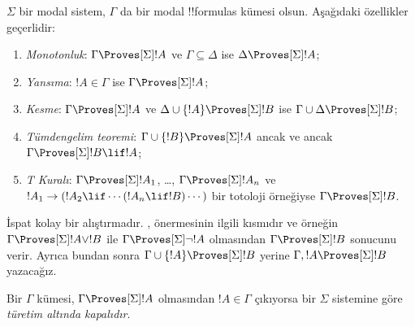 



\begin{prop}
  $\Sigma$ bir modal sistem, $\Gamma$ da bir modal !!{formula}s kümesi olsun.
  Aşağıdaki özellikler geçerlidir:
  \begin{enumerate}
  \item{} \emph{Monotonluk}:
    $\Gamma\Proves[\Sigma]!A$ ve $\Gamma\subseteq\Delta$ ise
    $\Delta\Proves[\Sigma]!A$;
  \item{}
    \emph{Yansıma}: $!A\in\Gamma$ ise
    $\Gamma\Proves[\Sigma]!A$;
  \item{} \emph{Kesme}:
    $\Gamma\Proves[\Sigma]!A$ ve
    $\Delta\cup\{!A\}\Proves[\Sigma]!B$ ise
    $\Gamma\cup\Delta\Proves[\Sigma]!B$;
  \item{} \emph{Tümdengelim teoremi}:
    $\Gamma\cup\{!B\}\Proves[\Sigma]!A$ ancak ve ancak
    $\Gamma\Proves[\Sigma]!B\lif !A$;
  \item {} \emph{T Kuralı}:
    $\Gamma\Proves[\Sigma]!A_1$, \dots, $\Gamma\Proves[\Sigma]!A_n$ ve
    $!A_1\to(!A_2\lif\cdots(!A_n\lif !B)\cdots)$ bir totoloji örneğiyse
    $\Gamma\Proves[\Sigma]!B$.
  \end{enumerate}
\end{prop}

İspat kolay bir alıştırmadır.
,
 önermesinin ilgili kısmıdır ve örneğin
$\Gamma\Proves[\Sigma]!A\lor !B$ ile $\Gamma\Proves[\Sigma]\lnot !A$
olmasından $\Gamma\Proves[\Sigma]!B$ sonucunu verir. Ayrıca bundan sonra
$\Gamma\cup\{!A\}\Proves[\Sigma]!B$ yerine
$\Gamma,!A\Proves[\Sigma]!B$ yazacağız.

\begin{defn}
  Bir $\Gamma$ kümesi, $\Gamma\Proves[\Sigma]!A$ olmasından
  $!A\in\Gamma$ çıkıyorsa bir $\Sigma$ sistemine göre
  \emph{türetim altında kapalıdır}.
\end{defn}

